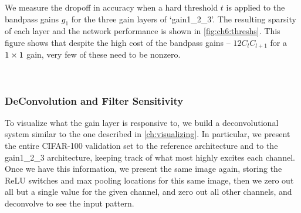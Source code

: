 We measure the dropoff in accuracy when a hard threshold $t$ is applied to the 
bandpass gains $g_1$ for the three gain layers of `gain1\_2\_3'. The resulting sparsity
of each layer and the network performance is shown in \autoref{fig:ch6:threshs}.
This figure shows that despite the high cost of the bandpass gains --
$12C_{l}C_{l+1}$ for a $1\times1$ gain, very few of these need to be nonzero.

\begin{figure}
  \centering
  \vspace{-0.5cm}
  \\\vspace{-0.3cm}
  \label{fig:ch6:bp_info}
\end{figure}

\subsubsection{DeConvolution and Filter Sensitivity}
To visualize what the gain layer is responsive to, we build a deconvolutional
system similar to the one described in \autoref{ch:visualizing}. In
particular, we present the entire CIFAR-100 validation set to the reference
architecture and to the gain1\_2\_3 architecture, keeping track of what most
highly excites each channel. Once we have this information, we present the same
image again, storing the ReLU switches and max pooling locations for this same
image, then we zero out all but a single value for the given channel, and zero out all
other channels, and deconvolve to see the input pattern.

